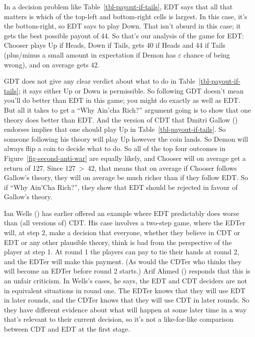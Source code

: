 \documentclass[
  12pt,
  letterpaper,
  DIV=11,
  numbers=noendperiod]{scrreprt}
\begin{document}
In a decision problem like Table~\ref{tbl-payout-if-tails}, EDT says
that all that matters is which of the top-left and bottom-right cells is
largest. In this case, it's the bottom-right, so EDT says to play Down.
That isn't absurd in this case; it gets the best possible payout of 44.
So that's our analysis of the game for EDT: Chooser plays Up if Heads,
Down if Tails, gets 40 if Heads and 44 if Tails (plus/minus a small
amount in expectation if Demon has \(\varepsilon\) chance of being
wrong), and on average gets 42.

GDT does not give any clear verdict about what to do in
Table~\ref{tbl-payout-if-tails}; it says either Up or Down is
permissible. So following GDT doesn't mean you'll do better than EDT in
this game; you might do exactly as well as EDT. But all it takes to get
a ``Why Ain'cha Rich?'' argument going is to show that one theory does
better than EDT. And the version of CDT that Dmitri Gallow
() endorses implies that one should play
Up in Table~\ref{tbl-payout-if-tails}. So someone following his theory
will play Up however the coin lands. So Demon will always flip a coin to
decide what to do. So all of the top four outcomes in
Figure~\ref{fig-second-anti-war} are equally likely, and Chooser will on
average get a return of 127. Since 127~\textgreater~42, that means that
on average if Chooser follows Gallow's theory, they will on average be
much richer than if they follow EDT. So if ``Why Ain'Cha Rich?'', they
show that EDT should be rejected in favour of Gallow's theory.

Ian Wells () has earlier offered an
example where EDT predictably does worse than (all versions of) CDT. His
case involves a two-step game, where the EDTer will, at step 2, make a
decision that everyone, whether they believe in CDT or EDT or any other
plausible theory, think is bad from the perspective of the player at
step 1. At round 1 the players can pay to tie their hands at round 2,
and the EDTer will make this payment. (As would the CDTer who thinks
they will become an EDTer before round 2 starts.) Arif Ahmed
() responds that this is an unfair
criticism. In Wells's cases, he says, the EDT and CDT deciders are not
in equivalent situations in round one. The EDTer knows that they will
use EDT in later rounds, and the CDTer knows that they will use CDT in
later rounds. So they have different evidence about what will happen at
some later time in a way that's relevant to their current decision, so
it's not a like-for-like comparison between CDT and EDT at the first
stage.
\end{document}
